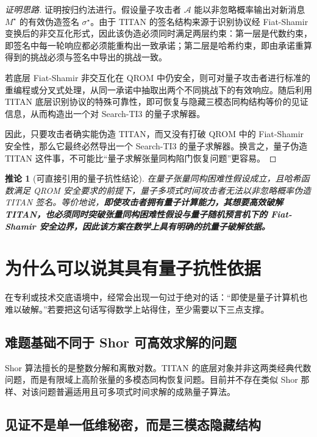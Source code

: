 \documentclass[12pt,a4paper]{article}
\newtheorem{corollary}{推论}[section]
\theoremstyle{remark}
\begin{document}
\begin{proof}[证明思路]
证明按归约法进行。假设量子攻击者 $\mathcal{A}$ 能以非忽略概率输出对新消息 $M^\star$ 的有效伪造签名 $\sigma^\star$。由于 TITAN 的签名结构来源于识别协议经 Fiat-Shamir 变换后的非交互化形式，因此该伪造必须同时满足两层约束：第一层是代数约束，即签名中每一轮响应都必须能重构出一致承诺；第二层是哈希约束，即由承诺重算得到的挑战必须与签名中导出的挑战一致。

若底层 Fiat-Shamir 非交互化在 QROM 中仍安全，则可对量子攻击者进行标准的重编程或分叉式处理，从同一承诺中抽取出两个不同挑战下的有效响应。随后利用 TITAN 底层识别协议的特殊可靠性，即可恢复与隐藏三模态同构结构等价的见证信息，从而构造出一个对 Search-TI3 的量子求解器。

因此，只要攻击者确实能伪造 TITAN，而又没有打破 QROM 中的 Fiat-Shamir 安全性，那么它最终必然导出一个 Search-TI3 的量子求解器。换言之，量子伪造 TITAN 这件事，不可能比“量子求解张量同构陷门恢复问题”更容易。
\end{proof}

\begin{corollary}[可直接引用的量子抗性结论]
在量子张量同构困难性假设成立，且哈希函数满足 QROM 安全要求的前提下，量子多项式时间攻击者无法以非忽略概率伪造 TITAN 签名。等价地说，\textbf{即使攻击者拥有量子计算能力，其想要高效破解 TITAN，也必须同时突破张量同构困难性假设与量子随机预言机下的 Fiat-Shamir 安全边界，因此该方案在数学上具有明确的抗量子破解依据。}
\end{corollary}

\section{为什么可以说其具有量子抗性依据}

在专利或技术交底语境中，经常会出现一句过于绝对的话：“即使是量子计算机也难以破解。”若要把这句话写得数学上站得住，至少需要以下三点支撑。

\subsection{难题基础不同于 Shor 可高效求解的问题}

Shor 算法擅长的是整数分解和离散对数。TITAN 的底层对象并非这两类经典代数问题，而是有限域上高阶张量的多模态同构恢复问题。目前并不存在类似 Shor 那样、对该问题普遍适用且可多项式时间求解的成熟量子算法。

\subsection{见证不是单一低维秘密，而是三模态隐藏结构}
\end{document}
